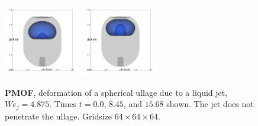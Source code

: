 \documentclass[preprint,12pt]{Definitions/elsarticle}
\begin{document}
\begin{figure}[H]
\begin{minipage}[b]{1\linewidth}
		\includegraphics[width=0.3\textwidth]{PMOFtankNoBreakup/PMOFtankNB_interface0010.png} 
		\includegraphics[width=0.3\textwidth]{PMOFtankNoBreakup/PMOFtankNB_interface0020.png} 
		\caption{\textbf{PMOF}, deformation of a spherical ullage due to a liquid jet, $We_{j}=4.875$.  
			Times $t=0.0$, $8.45$, and $15.68$ shown.
			The jet does not penetrate the ullage.  Gridsize $64\times 64\times 64$. }
		\label{3DWEJ4p875plsmof}
	\end{minipage}
\end{figure}
\end{document}

